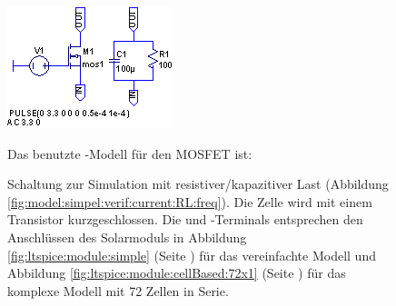 \begin{figure}[h!tb]
{{        \begin{minipage}{0.475\textwidth}
            \includegraphics[width=\textwidth]{images/ltspice/module-test-circuit-with-load.eps}
            \caption{%
                Schaltung   zur   Simulation   mit   resistiver/kapazitiver   Last
                (Abbildung   \ref{fig:model:simpel:verif:current:RL:freq}).    Die
                Zelle     wird    mit     einem    Transistor     kurzgeschlossen.
                Die    \textbf{}     und    \textbf{}-Terminals
                entsprechen      den       Anschl\"ussen      des      Solarmoduls
                in      Abbildung      \ref{fig:ltspice:module:simple}      (Seite
                \pageref{fig:ltspice:module:simple}) f\"ur das vereinfachte Modell
                und   Abbildung   \ref{fig:ltspice:module:cellBased:72x1}   (Seite
                \pageref{fig:ltspice:module:cellBased:72x1})  f\"ur  das  komplexe
                Modell mit 72 Zellen in Serie.%
            }
            \label{fig:model:simple:verif:circuit:Load}
        \end{minipage}%
    }}
    \vspace*{1em}
    Das benutzte -Modell f\"ur den MOSFET ist:\\
\end{figure}

